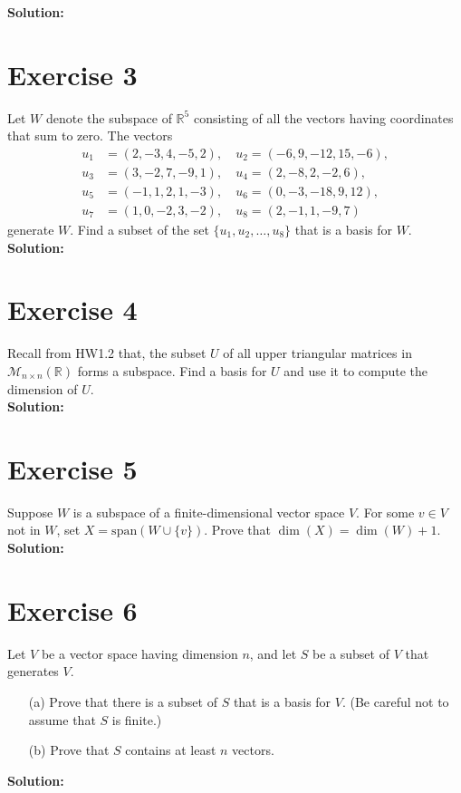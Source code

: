 \documentclass{article}
\begin{document}
\textbf{Solution:} \\



\newpage

\section*{Exercise 3}
Let $W$ denote the subspace of $\mathbb{R}^5$ consisting of all the vectors having coordinates that sum to zero. The vectors
\begin{align*}
u_1 &= (2,-3,4,-5,2), \quad u_2 = (-6,9,-12,15,-6),\\
u_3 &= (3,-2,7,-9,1), \quad u_4 = (2,-8,2,-2,6),\\
u_5 &= (-1,1,2,1,-3), \quad u_6 = (0,-3,-18,9,12),\\
u_7 &= (1,0,-2,3,-2), \quad u_8 = (2,-1,1,-9,7)
\end{align*}
generate $W$. Find a subset of the set $\{u_1,u_2,\ldots,u_8\}$ that is a basis for $W$. \\

\textbf{Solution:} \\



\newpage

\section*{Exercise 4}
Recall from HW1.2 that, the subset $U$ of all upper triangular matrices in $\mathcal{M}_{n\times n}(\mathbb{R})$ forms a subspace. Find a basis for $U$ and use it to compute the dimension of $U$. \\

\textbf{Solution:} \\



\newpage

\section*{Exercise 5}
Suppose $W$ is a subspace of a finite-dimensional vector space $V$. For some $v \in V$ not in $W$, set $X = \text{span}(W \cup \{v\})$. Prove that $\dim(X) = \dim(W) + 1$. \\

\textbf{Solution:} \\

\newpage

\section*{Exercise 6}
Let $V$ be a vector space having dimension $n$, and let $S$ be a subset of $V$ that generates $V$.
\begin{itemize}
\item[(a)] Prove that there is a subset of $S$ that is a basis for $V$. (Be careful not to assume that $S$ is finite.)
\item[(b)] Prove that $S$ contains at least $n$ vectors.
\end{itemize}

\textbf{Solution:} \\
\end{document}
